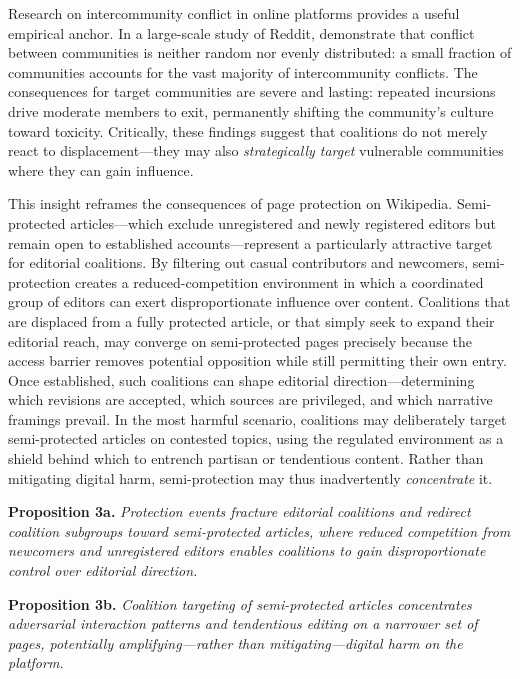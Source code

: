 \documentclass[11pt]{article}
\begin{document}
Research on intercommunity conflict in online platforms provides a useful empirical anchor. In a large-scale study of Reddit, \citet{Kumar2018} demonstrate that conflict between communities is neither random nor evenly distributed: a small fraction of communities accounts for the vast majority of intercommunity conflicts. The consequences for target communities are severe and lasting: repeated incursions drive moderate members to exit, permanently shifting the community's culture toward toxicity. Critically, these findings suggest that coalitions do not merely react to displacement---they may also \emph{strategically target} vulnerable communities where they can gain influence.

This insight reframes the consequences of page protection on Wikipedia. Semi-protected articles---which exclude unregistered and newly registered editors but remain open to established accounts---represent a particularly attractive target for editorial coalitions. By filtering out casual contributors and newcomers, semi-protection creates a reduced-competition environment in which a coordinated group of editors can exert disproportionate influence over content. Coalitions that are displaced from a fully protected article, or that simply seek to expand their editorial reach, may converge on semi-protected pages precisely because the access barrier removes potential opposition while still permitting their own entry. Once established, such coalitions can shape editorial direction---determining which revisions are accepted, which sources are privileged, and which narrative framings prevail. In the most harmful scenario, coalitions may deliberately target semi-protected articles on contested topics, using the regulated environment as a shield behind which to entrench partisan or tendentious content. Rather than mitigating digital harm, semi-protection may thus inadvertently \emph{concentrate} it.

\smallskip
\noindent\textbf{Proposition 3a.} \emph{Protection events fracture editorial coalitions and redirect coalition subgroups toward semi-protected articles, where reduced competition from newcomers and unregistered editors enables coalitions to gain disproportionate control over editorial direction.}

\smallskip
\noindent\textbf{Proposition 3b.} \emph{Coalition targeting of semi-protected articles concentrates adversarial interaction patterns and tendentious editing on a narrower set of pages, potentially amplifying---rather than mitigating---digital harm on the platform.}
\end{document}
